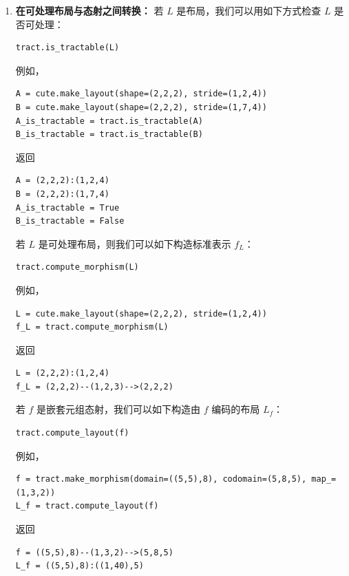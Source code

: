 \begin{enumerate}[left=0pt]
\item {\bf 在可处理布局与态射之间转换：}
若 $L$ 是布局，我们可以用如下方式检查 $L$ 是否可处理：
\begin{lstlisting}[language=cutedsl]
tract.is_tractable(L)
\end{lstlisting}
例如，
\begin{lstlisting}[language=cutedsl]
A = cute.make_layout(shape=(2,2,2), stride=(1,2,4))
B = cute.make_layout(shape=(2,2,2), stride=(1,7,4))
A_is_tractable = tract.is_tractable(A)
B_is_tractable = tract.is_tractable(B)
\end{lstlisting}
返回
\begin{lstlisting}[language=cutedsl]
A = (2,2,2):(1,2,4)
B = (2,2,2):(1,7,4)
A_is_tractable = True
B_is_tractable = False
\end{lstlisting}
若 $L$ 是可处理布局，则我们可以如下构造标准表示 $f_L$：
\begin{lstlisting}[language=cutedsl]
tract.compute_morphism(L)
\end{lstlisting}
例如，
\begin{lstlisting}[language=cutedsl]
L = cute.make_layout(shape=(2,2,2), stride=(1,2,4))
f_L = tract.compute_morphism(L)
\end{lstlisting}
返回
\begin{lstlisting}[language=cutedsl]
L = (2,2,2):(1,2,4)
f_L = (2,2,2)--(1,2,3)-->(2,2,2)
\end{lstlisting}
若 $f$ 是嵌套元组态射，我们可以如下构造由 $f$ 编码的布局 $L_f$：
\begin{lstlisting}[language=cutedsl]
tract.compute_layout(f)
\end{lstlisting}
例如，
\begin{lstlisting}[language=cutedsl]
f = tract.make_morphism(domain=((5,5),8), codomain=(5,8,5), map_=(1,3,2))
L_f = tract.compute_layout(f)
\end{lstlisting}
返回
\begin{lstlisting}[language=cutedsl]
f = ((5,5),8)--(1,3,2)-->(5,8,5)
L_f = ((5,5),8):((1,40),5)
\end{lstlisting}


\end{enumerate}
